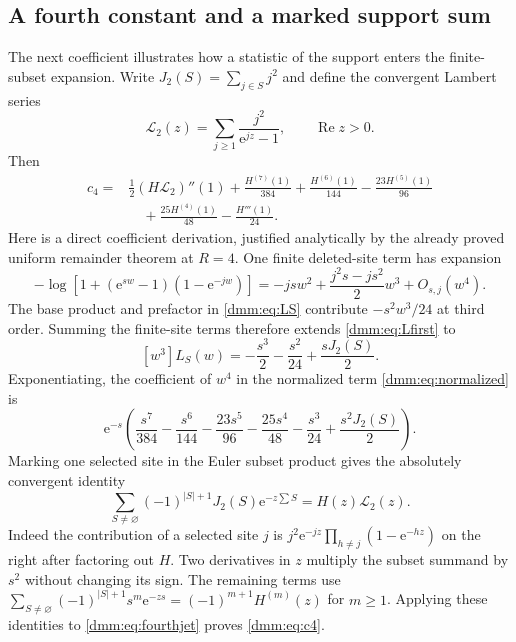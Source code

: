 \documentclass[11pt,letterpaper]{article}
\numberwithin{equation}{section}
\theoremstyle{definition}\newtheorem{definition}[theorem]{Definition}
\theoremstyle{remark}\newtheorem{remark}[theorem]{Remark}
\newcommand{\ee}{\mathrm e}
\DeclareMathOperator{\Rea}{Re}
\begin{document}
\subsection{A fourth constant and a marked support sum}
The next coefficient illustrates how a statistic of the support enters the finite-subset expansion. Write $J_2(S)=\sum_{j\in S}j^2$ and define the convergent Lambert series
\begin{equation}\label{dmm:eq:L2Lambert}
\mathcal L_2(z)=\sum_{j\ge1}\frac{j^2}{\ee^{jz}-1},\qquad \Rea z>0.
\end{equation}
Then
\begin{equation}\label{dmm:eq:c4}
\begin{split}
c_4={}&\frac12(H\mathcal L_2)''(1)
+\frac{H^{(7)}(1)}{384}+\frac{H^{(6)}(1)}{144}
-\frac{23H^{(5)}(1)}{96}\\
&\quad+\frac{25H^{(4)}(1)}{48}-\frac{H'''(1)}{24}.
\end{split}
\end{equation}
Here is a direct coefficient derivation, justified analytically by the already proved uniform remainder theorem at $R=4$. One finite deleted-site term has expansion
\[
-\log\left[1+(\ee^{sw}-1)(1-\ee^{-jw})\right]
=-jsw^2+\frac{j^2s-js^2}{2}w^3+O_{s,j}(w^4).
\]
The base product and prefactor in \eqref{dmm:eq:LS} contribute $-s^2w^3/24$ at third order. Summing the finite-site terms therefore extends \eqref{dmm:eq:Lfirst} to
\[
[w^3]L_S(w)=-\frac{s^3}{2}-\frac{s^2}{24}+\frac{sJ_2(S)}2.
\]
Exponentiating, the coefficient of $w^4$ in the normalized term \eqref{dmm:eq:normalized} is
\begin{equation}\label{dmm:eq:fourthjet}
\ee^{-s}\left(\frac{s^7}{384}-\frac{s^6}{144}
-\frac{23s^5}{96}-\frac{25s^4}{48}-\frac{s^3}{24}
+\frac{s^2J_2(S)}2\right).
\end{equation}
Marking one selected site in the Euler subset product gives the absolutely convergent identity
\begin{equation}\label{dmm:eq:markedidentity}
\sum_{S\ne\varnothing}(-1)^{|S|+1}J_2(S)\ee^{-z\sum S}
=H(z)\mathcal L_2(z).
\end{equation}
Indeed the contribution of a selected site $j$ is
$j^2\ee^{-jz}\prod_{h\ne j}(1-\ee^{-hz})$ on the right after factoring out $H$. Two derivatives in $z$ multiply the subset summand by $s^2$ without changing its sign. The remaining terms use
$\sum_{S\ne\varnothing}(-1)^{|S|+1}s^m\ee^{-zs}=(-1)^{m+1}H^{(m)}(z)$ for $m\ge1$. Applying these identities to \eqref{dmm:eq:fourthjet} proves \eqref{dmm:eq:c4}.
\end{document}
